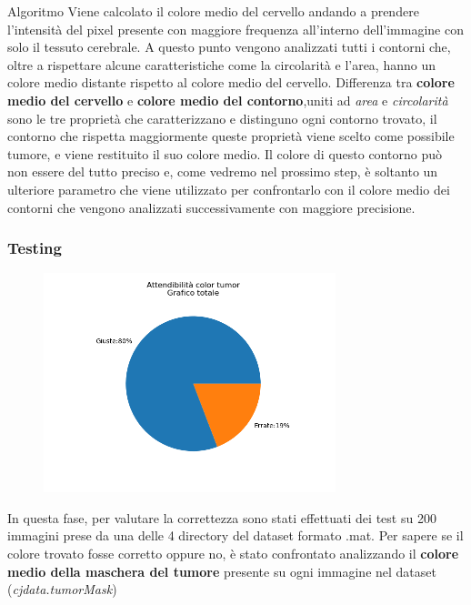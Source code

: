 \documentclass{article}
\begin{document}
\begin{my theorem}{Algoritmo}
    Viene calcolato il colore medio del cervello andando a prendere l'intensità del pixel presente con maggiore frequenza 
    all'interno dell'immagine con solo il tessuto cerebrale.
    A questo punto vengono analizzati tutti i contorni che, oltre a rispettare alcune caratteristiche come la circolarità e l'area,
    hanno un colore medio distante rispetto al colore medio del cervello.
    Differenza tra \textbf{colore medio del cervello} e \textbf{colore medio del contorno},uniti ad \textit{area} e \textit{circolarità} 
    sono le tre proprietà che caratterizzano e distinguno ogni contorno trovato, il contorno che rispetta maggiormente queste 
    proprietà viene scelto come possibile tumore, e viene restituito il suo colore medio.
    Il colore di questo contorno può non essere del tutto preciso e, come vedremo nel prossimo step, è soltanto un 
    ulteriore parametro che viene utilizzato per confrontarlo con il colore medio dei contorni che vengono analizzati 
    successivamente con maggiore precisione.
\end{my theorem}

\subsubsection{Testing}

\begin{figure}
    \includegraphics[width=8.5cm]{images/ct.png}
\end{figure}

In questa fase, per valutare la correttezza sono stati effettuati dei test su 200 immagini prese da una delle 4 directory del 
dataset formato .mat.
Per sapere se il colore trovato fosse corretto oppure no, è stato confrontato analizzando il \textbf{colore medio della maschera del tumore}
presente su ogni immagine nel dataset (\textit{cjdata.tumorMask})
\end{document}

